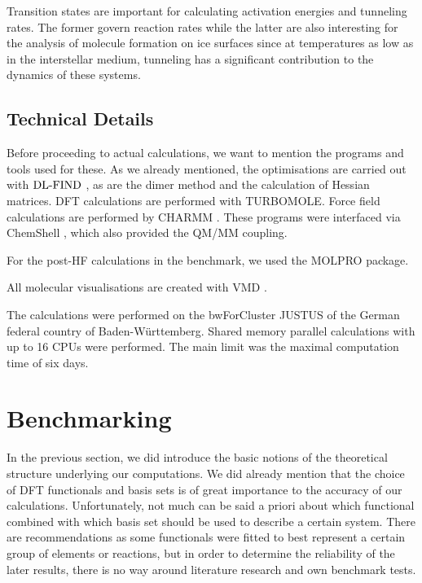 \documentclass[8.5pt,twoside,twocolumn]{article}
\newcommand\dlfind{\enmat{\te{DL-FIND}}}
\theoremstyle{standard}
\begin{document}
Transition states are important for calculating activation energies and
tunneling rates. The former govern reaction rates while the latter are also
interesting for the analysis of molecule formation on ice surfaces since at
temperatures as low as in the interstellar medium, tunneling has a significant
contribution to the dynamics of these systems.

\subsection{Technical Details}

Before proceeding to actual calculations, we want to mention the programs and tools 
used for these. As we already mentioned, the optimisations are carried out with
$\dlfind$ \cite{Kaestner2009}, as are the dimer method and the calculation of 
Hessian matrices. DFT calculations are performed with TURBOMOLE\cite{TURBOMOLE}.
Force field calculations are performed by CHARMM \cite{CHARMM2009}. These programs were interfaced
via ChemShell \cite{chemshell}, which also provided the QM/MM coupling.

For the post-HF calculations in the benchmark, we used the MOLPRO \cite{MOLPRO_brief}
package.

All molecular visualisations are created with VMD \cite{HUMP96}.

The calculations were performed on the bwForCluster JUSTUS of the German federal country
of Baden-Württemberg. Shared memory parallel calculations with up to 16 CPUs
were performed. The main limit was the maximal computation time of six days.



\section{Benchmarking}
\newcommand\htohto{\mbox{\enmat{\hto-\hto}}}
\newcommand\htoo{\mbox{\enmat{\hto-\hspace{.2pt} ^3\te{O}}}}
\newcommand\htoh{\mbox{\enmat{\hto-\te H}}}
\label{Sec:Bench}

In the previous section, we did introduce the basic notions of the theoretical structure underlying our
computations. We did already mention that the choice of DFT functionals and basis sets is of great importance
to the accuracy of our calculations. Unfortunately, not much can be said a priori about
which functional combined with which basis set should be used to describe a certain system.
There are recommendations as some functionals were fitted to best represent a certain
group of elements or reactions, but in order to determine the reliability of the
later results, there is no way around literature research and own benchmark tests.
\end{document}
